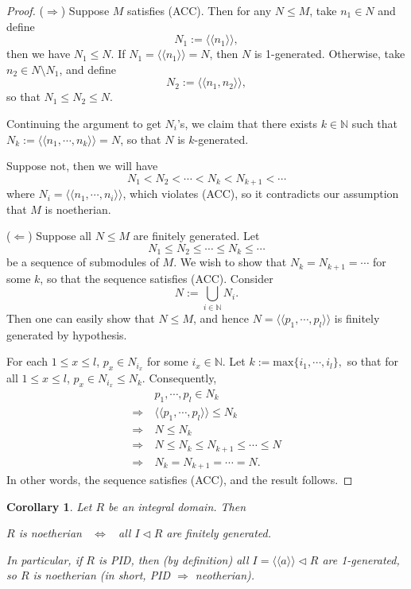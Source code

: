 \documentclass[12pt]{amsbook}
\newtheorem{corollary}[theorem]{Corollary}
\begin{document}
\begin{proof}
    ($\Rightarrow$) Suppose $M$ satisfies (ACC). Then for any $N\leq M$, take $n_1\in N$ and define
    $$N_1:=\langle\langle n_1\rangle\rangle,$$
    then we have $N_1\leq N$. If $N_1=\langle\langle n_1\rangle\rangle=N$, then $N$ is 1-generated. Otherwise, take $n_2\in N\setminus N_1$, and define
    $$N_2:=\langle\langle n_1,n_2\rangle\rangle,$$
    so that $N_1\leq N_2\leq N$.

    Continuing the argument to get $N_{i}$'s, we claim that there exists $k\in \mathbb{N}$ such that $N_k:=\langle\langle n_1,\cdots,n_k\rangle\rangle=N$, so that $N$ is $k$-generated.

    Suppose not, then we will have 
    $$N_1<N_2<\cdots<N_k<N_{k+1}<\cdots$$
    where $N_i=\langle\langle n_1,\cdots,n_i\rangle\rangle$, which violates (ACC), so it contradicts our assumption that $M$ is noetherian.

    \medskip
    ($\Leftarrow$) Suppose all $N\leq M$ are finitely generated. Let 
    $$N_1\leq N_2\leq\cdots\leq N_k\leq\cdots$$
    be a sequence of submodules of $M$. We wish to show that  $N_k=N_{k+1}=\cdots$ for some $k$, so that the sequence satisfies (ACC). Consider
    $$N:=\bigcup_{i\in\mathbb{N}}N_i.$$
    Then one can easily show that $N\leq M$, and hence $N=\langle\langle p_1,\cdots,p_l\rangle\rangle$ is finitely generated by hypothesis.

    For each $1\leq x\leq l$, $p_x\in N_{i_x}$ for some $i_x\in\mathbb{N}$. Let $k:=\mathrm{max}\{i_1,\cdots,i_l\},$
    so that for all $1 \leq x \leq l$, $p_x \in N_{i_x} \leq N_k$. Consequently,
    \begin{align*}
            &p_1,\cdots,p_l \in N_k  \\  
        \Rightarrow\ &\langle\langle p_1,\cdots,p_l \rangle\rangle\leq N_k\\
        \Rightarrow\ &N\leq N_k\\
        \Rightarrow\ &N\leq N_k\leq N_{k+1}\leq\cdots\leq N\\
        \Rightarrow\ &N_k=N_{k+1}=\cdots=N.
    \end{align*}
    In other words, the sequence satisfies (ACC), and the result follows.
\end{proof}

\begin{corollary} \label{fgforideals}
Let $R$ be an integral domain. Then
\begin{center}
    $R$ is noetherian \ $\Leftrightarrow$ \ all $I\lhd R$ are finitely generated.
\end{center}
    In particular, if $R$ is PID, then (by definition) all $I=\langle\langle a\rangle\rangle\lhd R$ are 1-generated, so $R$ is noetherian (in short, PID $\Rightarrow$ neotherian).
\end{corollary}
\end{document}
